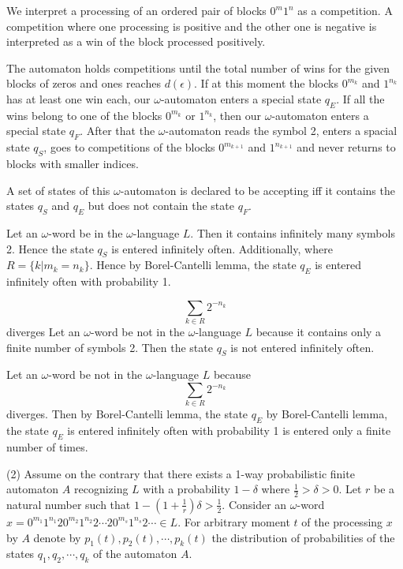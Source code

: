\documentclass{llncs}
\begin{document}
We interpret a processing of an ordered pair of blocks $0^m1^n$ as a competition. A competition where one processing is positive and the other one
is negative is interpreted as a win of the block processed positively.

The automaton holds competitions until the total number of wins for the given blocks of zeros and ones reaches $d(\epsilon )$. If at this moment  the
blocks $0^{m_k}$ and $1^{n_k}$ has at least one win each, our $\omega $-automaton enters a special state $q_E$. If all the wins belong to one of the blocks
$0^{m_k}$ or $1^{n_k}$, then our $\omega $-automaton enters a special state $q_F$. After that the $\omega $-automaton reads the symbol 2, enters a spacial state $q_S$, goes to competitions of the blocks $0^{m_{k+1}}$ and $1^{n_{k+1}}$ and never returns to blocks with smaller indices.

A set of states of this  $\omega $-automaton is declared to be accepting iff it contains the states $q_S$ and $q_E$ but does not contain the state $q_F$.

Let an $\omega $-word be in the $\omega $-language $L$. Then it contains infinitely many symbols 2. Hence the state $q_S$ is entered infinitely often. 
Additionally,
 where $R = \{ k | m_k = n_k \}$. Hence by Borel-Cantelli lemma, the state $q_E$ is entered infinitely often with probability 1.

$$
\sum_{k \in R}{2^{-n_k}}
$$
diverges
Let an $\omega $-word be not in the $\omega $-language $L$ because it contains only a finite number of symbols 2. Then the state $q_S$ is not entered infinitely often.

Let an $\omega $-word be not in the $\omega $-language $L$ because
$$
\sum_{k \in R}{2^{-n_k}}
$$
diverges. Then by Borel-Cantelli lemma, the state $q_E$ by Borel-Cantelli lemma, the state $q_E$ is entered infinitely often with probability 1 is entered only a finite number of times. 

\bigskip


(2) Assume on the contrary that there exists a 1-way probabilistic finite
automaton $A$ recognizing $L$ with a probability $1 - \delta $ where $\frac{1}{2} > \delta > 0$. Let $r$ be a natural number such that 
$1-(1+\frac{1}{r}) \delta >\frac{1}{2}$.
Consider an $\omega $-word
$x = 0^{m_1}1^{n_1}20^{m_2}1^{n_2}2\cdots 20^{m_s}1^{n_s}2\cdots \in L$. 
For arbitrary moment $t$ of the processing $x$ by $A$ denote by $p_1(t), p_2(t), \cdots , p_k(t)$ the distribution of probabilities
of the states $q_1, q_2, \cdots , q_k$ of the automaton $A$. 
\end{document}
